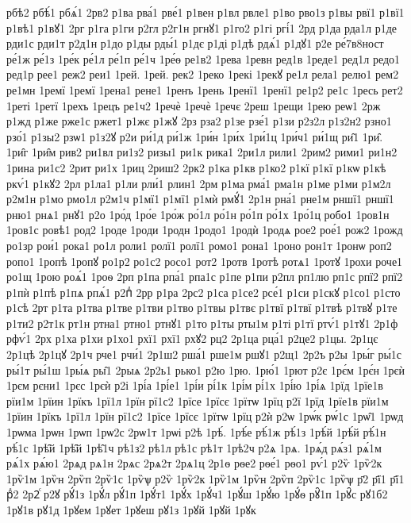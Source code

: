 {рбѣ2
рбѣ́1
рбѧ́1
2рв2
р1ва
рва́1
рве́1
р1вен
р1вл
рвле1
р1во
рво1з
р1вы
рвї1
р1вї1
р1вѣ1
р1вꙋ1
2рг
р1га
р1ги
р2гл
р2г1н
ргнꙋ1
р1го2
р1гі
ргі́1
2рд
р1да
рда1л
р1де
рди1с
рди1т
р2д1н
р1до
р1ды
рды́1
р1дє
р1ді
р1дѣ
рдѧ́1
р1дꙋ1
р2е
ре́7в8ност
ре́1ж
ре́1з
1ре́к
ре́1л
ре́1п
ре́1ч
1ре́ѳ
ре1в2
1рева
1ревн
ред1в
1реде1
ред1л
редо1
ред1р
рее1
реж2
реи1
1рей.
1рей.
рек2
1реко
1рекі
1рекꙋ
ре1л
рела1
релю1
рем2
ре1мн
1ремї
1ремї
1рена1
рене1
1ренъ
1рень
1ренї1
1ренї1
ре1р2
ре1с
1ресь
рет2
1реті
1ретї
1рехъ
1рецъ
ре1ч2
1речѐ
1речѐ
1речє
2реш
1рещи
1рею
реѡ1
2рж
р1жд
р1же
рже1с
ржет1
р1жє
р1жꙋ
2рз
рза2
р1зе
рзе́1
р1зи
р2з2л
р1з2н2
рзно1
рзо́1
р1зы2
рзѡ1
р1з2ꙋ
р2и
ри́1д
ри́1ж
1ри́н
1ри́х
1ри́1ц
1ри́ч1
ри́1щ
ри̑1
1ри̑.
1ри̑г
1ри̑м
рив2
ри1вл
ри1з2
ризы1
ри1к
рика1
2ри1л
рили1
2рим2
рими1
ри1н2
1рина
ри1с2
2рит
ри1х
1риц
2риш2
2рк2
р1ка
р1кв
р1ко2
р1кї
р1кї
р1кѡ
р1кѣ
ркѵ́1
р1кꙋ2
2рл
р1ла1
р1ли
рли́1
рлин1
2рм
р1ма
рма́1
рма1н
р1ме
р1ми
р1м2л
р2м1н
р1мо
рмо1л
р2м1ч
р1мї1
р1мї1
р1мѝ
рмꙋ́1
2р1н
рна́1
рне1м
рншї1
рншї1
рню1
рнѧ1
рнꙋ1
р2о
1ро́д
1ро́е
1ро́ж
ро́1л
ро́1н
ро́1п
ро́1х
1ро́1ц
робо1
1ров1н
1ров1с
ровѣ1
род2
1роде
1роди
1родн
1родо1
1родѝ
1родѧ
рое2
рое́1
рож2
1рожд
ро1зр
рои́1
рока1
ро1л
роли1
ролї1
ролї1
ромо1
рона1
1роно
рон1т
1ронѡ
роп2
ропо1
1ропѣ
1ропꙋ
ро1р2
ро1с2
росо1
рот2
1ротв
1ротѣ
ротѧ1
1ротꙋ
1рохи
роче1
ро1щ
1рою
роѧ́1
1роѳ
2рп
р1па
рпа́1
рпа1с
р1пе
р1пи
р2пл
рп1лю
рп1с
рпї2
рпї2
р1пѝ
р1пѣ
р1пѧ
рпѧ́1
р2пⷣ
2рр
р1ра
2рс2
р1са
р1се2
рсе́1
р1си
р1скꙋ
р1со1
р1сто
р1сѣ
2рт
р1та
р1тва
р1тве
р1тви
р1тво
р1твы
р1твє
р1твї
р1твї
р1твѣ
р1твꙋ
р1те
р1ти2
р2т1к
рт1н
ртна1
ртно1
ртнꙋ1
р1то
р1ты
рты1м
р1ті
р1тї
ртѵ́1
р1тꙋ1
2р1ф
рфѵ́1
2рх
р1ха
р1хи
р1хо1
рхї1
рхї1
рхꙋ2
рц2
2р1ца
рца́1
р2це2
р1цы.
2р1цє
2р1цѣ
2р1цꙋ
2р1ч
рче1
рчи́1
2р1ш2
рша́1
рше1м
ршꙋ1
р2щ1
2р2ъ
р2ы
1ры́г
ры́1с
ры́1т
ры́1ш
1ры́ѧ
ры̑1
2рыѧ
2р2ь1
рько1
р2ю
1рю.
1рю́1
1рют
р2є
1рє́м
1рє́н
1рєѝ
1рєм
рєни1
1рєс
1рєѝ
р2і
1рі́а
1рі́е1
1рі́и
рі́1к
1рі́м
рі́1х
1рі́ю
1рі́ѧ
1рїд
1рїе1в
рїи1м
1рїин
1рїкъ
1рї1л
1рїн
рї1с2
1рїсе
1рїсє
1рїтѡ
1рїц
р2ї
1рїд
1рїе1в
рїи1м
1рїин
1рїкъ
1рї1л
1рїн
рї1с2
1рїсе
1рїсє
1рїтѡ
1рїц
р2ѝ
р2ѡ
1рѡ́к
рѡ́1с
1рѡ̑1
1рѡд
1рѡма
1рѡн
1рѡп
1рѡ2с
2рѡ1т
1рѡі
р2ѣ
1рѣ́.
1рѣ́е
рѣ́1ж
рѣ́1з
1рѣ́й
1рѣ́й
рѣ́1н
рѣ́1с
1рѣ̑й
1рѣ̑й
1рѣ̑1ч
рѣ1з2
рѣ1л
рѣ1с
рѣ1т
1рѣ2ч
р2ѧ
1рѧ.
1рѧ́д
рѧ́з1
рѧ́1м
рѧ́1х
рѧ́ю1
2рѧд
рѧ1н
2рѧс
2рѧ2т
2рѧ1ц
2р1ѳ
рѳе2
рѳе́1
рѳо1
рѵ́1
р2ѷ
1рѷ2к
1рѷ1м
1рѷн
2рѷп
2рѷ1с
1рѷѱ
р2ѷ
1рѷ2к
1рѷ1м
1рѷн
2рѷп
2рѷ1с
1рѷѱ
р҃2
р҃ї1
р҃ї1
рⷣ2
2р2ⷭ
р2ꙋ
рꙋ́1з
1рꙋ́л
рꙋ́1п
1рꙋ́т1
1рꙋ́х
1рꙋ́ч1
1рꙋ́ш
1рꙋ́ю
1рꙋ́ѳ
рꙋ̑1п
1рꙋ̑с
рꙋ1б2
1рꙋ1в
рꙋ1д
1рꙋем
1рꙋет
1рꙋеш
рꙋ1з
1рꙋй
1рꙋй
1рꙋк
}
